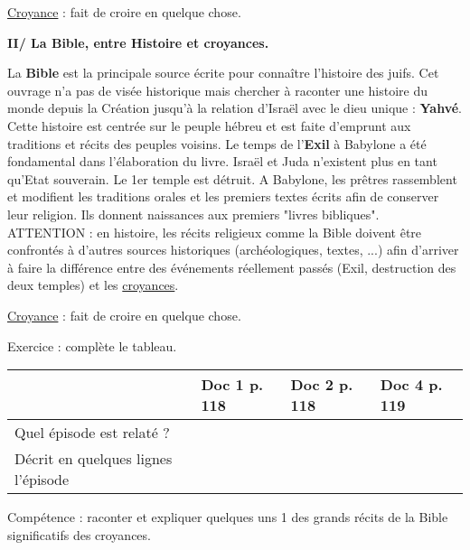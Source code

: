 \documentclass[12pt]{article}
\begin{document}
\vspace{0.5cm}

\underline{Croyance} : fait de croire en quelque chose.

\vfill

\textbf{II/ La Bible, entre Histoire et croyances.}

\vspace{0.5cm}

\setlength{\parindent}{1cm}La \textbf{Bible} est la principale source écrite pour connaître l'histoire des juifs. Cet ouvrage n'a pas de visée historique mais chercher à raconter une histoire du monde depuis la Création jusqu'à la relation d'Israël avec le dieu unique : \textbf{Yahvé}. Cette histoire est centrée sur le peuple hébreu et est faite d'emprunt aux traditions et récits des peuples voisins.
Le temps de l'\textbf{Exil} à Babylone a été fondamental dans l'élaboration du livre. Israël et Juda n'existent plus en tant qu'Etat souverain. Le 1er temple est détruit. A Babylone, les prêtres rassemblent et modifient les traditions orales et les premiers textes écrits afin de conserver leur religion. Ils donnent naissances aux premiers "livres bibliques".\\
ATTENTION : en histoire, les récits religieux comme la Bible doivent être confrontés à d'autres sources historiques (archéologiques, textes, ...) afin d'arriver à faire la différence entre des événements réellement passés (Exil, destruction des deux temples) et les \underline{croyances}.

\vspace{0.5cm}

\underline{Croyance} : fait de croire en quelque chose.

\newpage

Exercice : complète le tableau.

\begin{tabular}{|p{3cm}|p{4cm}|p{4cm}|p{4cm}}
\hline  & Doc 1 p. 118 & Doc 2 p. 118 & Doc 4 p. 119 \\ 
\hline Quel épisode est relaté ? & \hspace{4cm} &  &  \\ 
\hline Décrit en quelques lignes l'épisode & \hspace{4cm}  &  &  \\ 
\hline 
\end{tabular} 

\vspace{1cm}

Compétence : raconter et expliquer quelques uns 1 des grands récits de la Bible significatifs des croyances.
\end{document}
